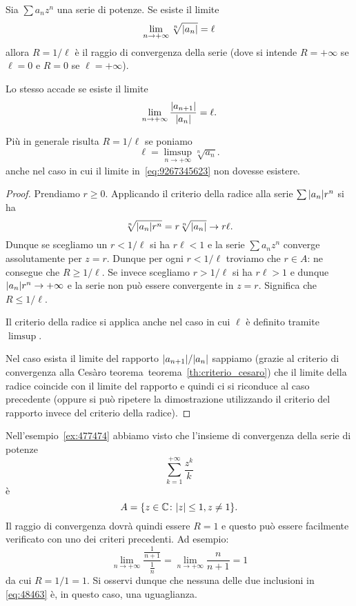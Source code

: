 \begin{theorem}
\mymark{***}
\label{th:calcolo_raggio_convergenza}
Sia $\sum a_n z^n$ una serie di potenze. Se esiste il limite
\begin{equation}\label{eq:9267345623}
  \lim_{n\to+\infty}\sqrt[n]{{\left|a_n\right|}} =\ell
\end{equation}
allora $R=1/\ell$ è il raggio di convergenza della serie
(dove si intende $R=+\infty$ se $\ell = 0$ e $R=0$ se $\ell=+\infty$).

Lo stesso accade se esiste il limite
\[
  \lim_{n\to +\infty} \frac{{\left|a_{n+1}\right|}}{{\left|a_n\right|}} = \ell.
\]

Più in generale risulta $R=1/\ell$ se poniamo
\[
   \ell = \limsup_{n\to +\infty} \sqrt[n]{a_n}.
\]
anche nel caso in cui il limite in~\eqref{eq:9267345623}
non dovesse esistere.
\end{theorem}
%
\begin{proof}
\mymark{***}
Prendiamo $r\ge 0$.
Applicando il criterio della radice alla serie $\sum {\left|a_n\right|} r^n$ si ha
\[
  \sqrt[n]{{\left|a_n\right|} r^n}
  = r \sqrt[n]{{\left|a_n\right|}} \to r\ell.
\]
Dunque se scegliamo un $r < 1/\ell$ si ha $r \ell<1$ e la serie
$\sum a_n z^n$ converge
assolutamente per $z=r$.
Dunque per ogni $r<1/\ell$
troviamo che $r\in A$: ne consegue che $R\ge 1/\ell$.
Se invece scegliamo $r > 1/\ell$ si ha $r \ell > 1$ e dunque
${\left|a_n\right|} r^n \to +\infty$ e la serie non può essere convergente
in $z=r$. Significa che $R\le 1/\ell$.

Il criterio della radice si applica anche nel caso in cui $\ell$ è definito
tramite $\limsup$.

Nel caso esista il limite del rapporto ${\left|a_{n+1}\right|} / {\left|a_n\right|}$
sappiamo (grazie al criterio di convergenza alla Cesàro teorema~teorema~\ref{th:criterio_cesaro}) che
il limite della radice coincide con il limite del rapporto e quindi
ci si riconduce al caso precedente (oppure si può ripetere la dimostrazione
utilizzando il criterio del rapporto invece del criterio della radice).
\end{proof}

\begin{example}
Nell'esempio~\ref{ex:477474} abbiamo visto
che l'insieme di convergenza della serie di potenze
\[
  \sum_{k=1}^{+\infty} \frac{z^k}{k}
\]
è
\[
  A = {\left\{  z\in \mathbb C \colon {\left|z\right|}\le 1, z\neq 1 \right\}}.
\]
Il raggio di convergenza dovrà quindi essere $R=1$ e questo può essere
facilmente verificato con uno dei criteri precedenti. Ad esempio:
\[
  \lim_{n\to+\infty} \frac{\frac{1}{n+1}}{\frac{1}{n}}
  = \lim_{n\to+\infty} \frac{n}{n+1} = 1
\]
da cui $R=1/1=1$.
Si osservi dunque che nessuna delle due inclusioni in \eqref{eq:48463}
è, in questo caso, una uguaglianza.
\end{example}

